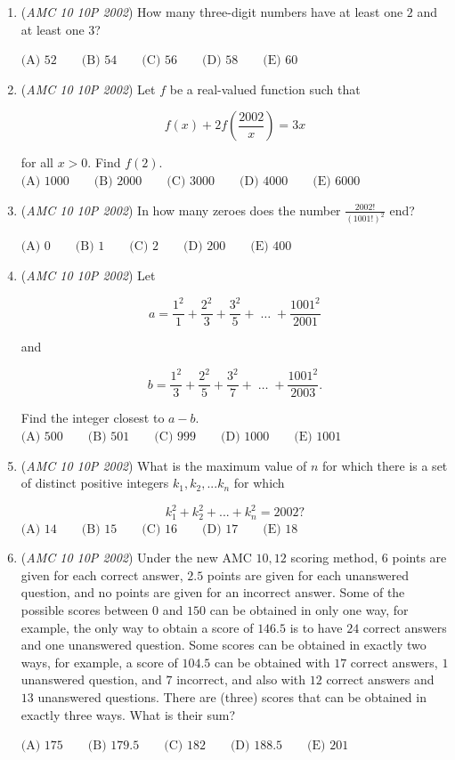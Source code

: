\begin{enumerate}
	\item (\textit{AMC 10 10P 2002}) How many three-digit numbers have at least one $2$ and at least one $3$?


 $\text{(A) }52 \qquad \text{(B) }54  \qquad \text{(C) }56 \qquad \text{(D) }58 \qquad \text{(E) }60$


	\item (\textit{AMC 10 10P 2002}) Let $f$ be a real-valued function such that


 
 \[f(x) + 2f(\frac{2002}{x}) = 3x\]


 for all $x>0.$ Find $f(2).$
$\text{(A) }1000 \qquad \text{(B) }2000 \qquad \text{(C) }3000 \qquad \text{(D) }4000 \qquad \text{(E) }6000$


	\item (\textit{AMC 10 10P 2002}) In how many zeroes does the number $\frac{2002!}{(1001!)^2}$ end?


 $\text{(A) }0 \qquad \text{(B) }1 \qquad \text{(C) }2 \qquad \text{(D) }200 \qquad \text{(E) }400$


	\item (\textit{AMC 10 10P 2002}) Let

 \[a=\frac{1^2}{1} + \frac{2^2}{3} + \frac{3^2}{5} +  \; \dots \; + \frac{1001^2}{2001}\]


 and


 
 \[b=\frac{1^2}{3} + \frac{2^2}{5} + \frac{3^2}{7} +  \; \dots \; + \frac{1001^2}{2003}.\]


 Find the integer closest to $a-b.$
$\text{(A) }500 \qquad \text{(B) }501 \qquad \text{(C) }999 \qquad \text{(D) }1000 \qquad \text{(E) }1001$


	\item (\textit{AMC 10 10P 2002}) What is the maximum value of $n$ for which there is a set of distinct positive integers $k_1, k_2, ... k_n$ for which


 
 \[k^2_1 + k^2_2 + ... + k^2_n = 2002?\]
$\text{(A) }14 \qquad \text{(B) }15 \qquad \text{(C) }16 \qquad \text{(D) }17 \qquad \text{(E) }18$


	\item (\textit{AMC 10 10P 2002}) Under the new AMC $10, 12$ scoring method, $6$ points are given for each correct answer, $2.5$ points are given for each unanswered question, and no points are given for an incorrect answer. Some of the possible scores between $0$ and $150$ can be obtained in only one way, for example, the only way to obtain a score of $146.5$ is to have $24$ correct answers and one unanswered question. Some scores can be obtained in exactly two ways, for example, a score of $104.5$ can be obtained with $17$ correct answers, $1$ unanswered question, and $7$ incorrect, and also with $12$ correct answers and $13$ unanswered questions. There are (three) scores that can be obtained in exactly three ways. What is their sum?


 

$\text{(A) }175 \qquad \text{(B) }179.5 \qquad \text{(C) }182 \qquad \text{(D) }188.5 \qquad \text{(E) }201$


\end{enumerate}
